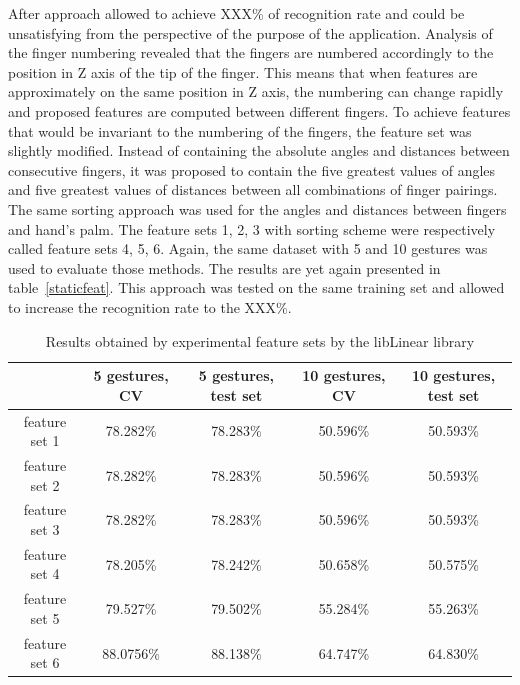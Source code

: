 After approach allowed to achieve XXX\% of recognition rate and could be unsatisfying from the perspective of the purpose of the application. 
Analysis of the finger numbering revealed that the fingers are numbered accordingly to the position in Z axis of the tip of the finger.
This means that when features are approximately on the same position in Z axis, the numbering can change rapidly and proposed features are computed between different fingers.
To achieve features that would be invariant to the numbering of the fingers, the feature set was slightly modified.
Instead of containing the absolute angles and distances between consecutive fingers, it was proposed to contain the five greatest values of angles and five greatest values of distances between all combinations of finger pairings.
The same sorting approach was used for the angles and distances between fingers and hand's palm.
The feature sets 1, 2, 3 with sorting scheme were respectively called feature sets 4, 5, 6.
Again, the same dataset with 5 and 10 gestures was used to evaluate those methods. 
The results are yet again presented in table~\ref{staticfeat}.
This approach was tested on the same training set and allowed to increase the recognition rate to the XXX\%.

\begin{table}[htp!]
\begin{center}
	\label{staticfeatlin}
	\caption{Results obtained by experimental feature sets by the libLinear library}
    \begin{tabular}{|c|c|c|c|c|}
    \hline
    ~                                                   & 5 gestures, CV & 5 gestures, test set & 10 gestures, CV  & 10 gestures, test set \\ \hline
    feature set 1                     & 78.282\% & 78.283\%  & 50.596\% & 50.593\% \\ \hline
    feature set 2                     & 78.282\% & 78.283\%  & 50.596\% & 50.593\% \\ \hline
    feature set 3                     & 78.282\% & 78.283\%  & 50.596\% & 50.593\% \\ \hline
    feature set 4                     & 78.205\% & 78.242\%  & 50.658\% & 50.575\% \\ \hline
    feature set 5                     & 79.527\% & 79.502\%  & 55.284\% & 55.263\% \\ \hline
    feature set 6                     & 88.0756\% & 88.138\% & 64.747\% & 64.830\% \\ \hline
    \end{tabular}
    \end{center}
\end{table}

